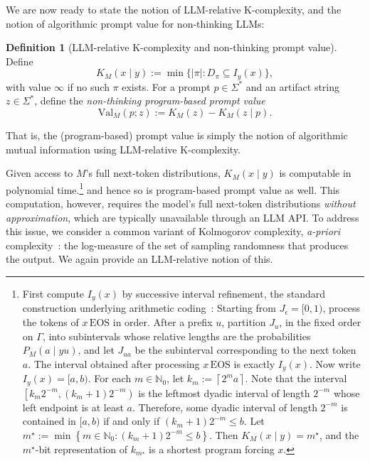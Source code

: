 \documentclass[letterpaper]{article} %
\theoremstyle{definition}
\newtheorem{definition}[theorem]{Definition}
\theoremstyle{remark}
\newcommand{\Val}{\mathrm{Val}}
\newcommand{\eps}{\epsilon}
\newcommand{\EOS}{\mathrm{EOS}}
\begin{document}
We are now ready to state the notion of LLM-relative K-complexity, and the notion of algorithmic prompt value for non-thinking LLMs:
\begin{definition}[LLM-relative K-complexity and non-thinking prompt value]\label{def:KM}
Define
\begin{equation}
K_M(x \mid y) := \min\{ |\pi| : D_\pi \subseteq I_y(x) \},
\end{equation}
with value $\infty$ if no such $\pi$ exists. For a prompt $p \in \Sigma^*$ and
an artifact string $z \in \Sigma^*$, define the \emph{non-thinking program-based prompt value}
\begin{equation}
\Val_M(p;z) := K_M(z) - K_M(z \mid p).
\end{equation}
\end{definition}
That is, the (program-based) prompt value is simply the notion of algorithmic mutual information using LLM-relative K-complexity.

Given access to \(M\)'s full next-token distributions,
\(K_M(x\mid y)\) is computable in polynomial time.\footnote{First
compute \(I_y(x)\) by successive interval refinement, the standard construction
underlying arithmetic coding~\cite{WNC87}: Starting from
\(J_{\eps}=[0,1)\), process the tokens of \(x\,\EOS\) in order.  After a prefix
\(u\), partition \(J_u\), in the fixed order on \(\Gamma\), into subintervals
whose relative lengths are the probabilities \(P_M(a\mid yu)\), and let
\(J_{ua}\) be the subinterval corresponding to the next token \(a\).  The
interval obtained after processing \(x\,\EOS\) is exactly \(I_y(x)\).   
Now write \(I_y(x)=[a,b)\).  For each \(m\in\mathbb N_0\), let
$k_m:=\left\lceil 2^m a\right\rceil$.
Note that the interval
  $\left[k_m2^{-m},(k_m+1)2^{-m}\right)$
is the leftmost dyadic interval of length \(2^{-m}\) whose left endpoint is at
least \(a\).  Therefore, some dyadic interval of length \(2^{-m}\) is
contained in \([a,b)\) if and only if $(k_m+1)2^{-m}\leq b$.
Let $m^\star
  :=
  \min\left\{
    m\in\mathbb N_0:
    (k_m+1)2^{-m}\leq b
  \right\}$.
Then \(K_M(x\mid y)=m^\star\), and the \(m^\star\)-bit representation of
\(k_{m^\star}\) is a shortest program forcing \(x\).
} and hence so is program-based prompt value as well.  This
computation, however, requires the model's full next-token distributions
\emph{without approximation}, which are typically unavailable through an LLM
API.
%
To address this issue, we consider a common variant of Kolmogorov complexity,
\emph{a-priori} complexity~\cite{ZL70,LiVitanyi}: the log-measure of the set
of sampling randomness that produces the output.  We again provide an
LLM-relative notion of this.
\end{document}
